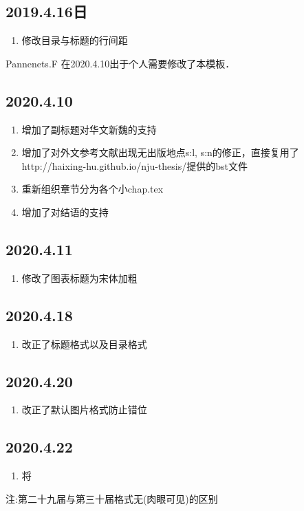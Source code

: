 \subsection{2019.4.16日}
\begin{enumerate}
    \item 修改目录与标题的行间距

\end{enumerate}

Pannenets.F 在2020.4.10出于个人需要修改了本模板．

\subsection{2020.4.10}
\begin{enumerate}
    \item 增加了副标题对华文新魏的支持
    \item 增加了对外文参考文献\cite{ghostnet}出现无出版地点s:l, s:n的修正，直接复用了http://haixing-hu.github.io/nju-thesis/提供的bst文件
    \item 重新组织章节分为各个小chap.tex
    \item 增加了对结语的支持
\end{enumerate}


\subsection{2020.4.11}
\begin{enumerate}
    \item 修改了图表标题为宋体加粗
\end{enumerate}

\subsection{2020.4.18}
\begin{enumerate}
    \item 改正了标题格式以及目录格式
\end{enumerate}

\subsection{2020.4.20}
\begin{enumerate}
    \item 改正了默认图片格式防止错位
\end{enumerate}

\subsection{2020.4.22}
\begin{enumerate}
    \item 将\ \
\end{enumerate}

注:第二十九届与第三十届格式无(肉眼可见)的区别


